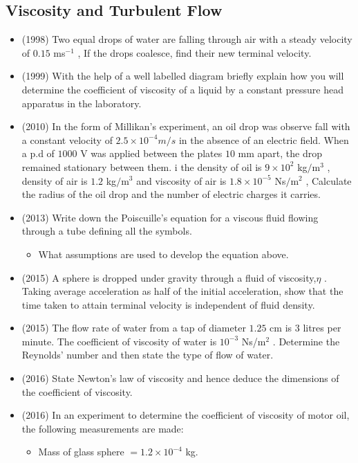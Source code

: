 \documentclass{article}
\begin{document}
\subsection{Viscosity and Turbulent Flow}
\begin{itemize}
\item (1998)  Two equal drops of water are falling through air with a steady velocity of $ 0.15$ ms$ ^{-1}$ , If the drops coalesce, find their new terminal velocity.
\item (1999)  With the help of a well labelled diagram briefly explain how you will determine the coefficient of viscosity of a liquid by a constant pressure head apparatus in the laboratory.
\item (2010)  In the form of Millikan’s experiment, an oil drop was observe fall with a constant velocity of $ 2.5	\times 10^{-4}m/s$ in the absence of an electric field. When a p.d of $ 1000$ V was applied between the plates $ 10$ mm apart, the drop remained stationary between them. i the density of oil is $ 9 \times 10^{2}$ kg$/$m$ ^{3}$ , density of air is $ 1.2$ kg$/$m$ ^{3}$ and viscosity of air is $ 1.8\times 10^{-5}$ Ns$/$m$ ^{2}$ , Calculate the radius of the oil drop and the number of electric charges it carries.
\item (2013)  Write down the Poiscuille’s equation for a viscous fluid flowing through a tube defining all the symbols.\begin{itemize}
\item What assumptions are used to develop the equation above. 
\end{itemize}
\item (2015)  A sphere is dropped under gravity through a fluid of viscosity,$ \eta $ .  Taking average acceleration as half of the initial acceleration, show that the time taken to attain terminal velocity is independent of fluid density.
\item (2015)  The flow rate of water from a tap of diameter $ 1.25$ cm is $ 3$ litres per minute.  The coefficient of viscosity of water is $ 10^{-3}$ Ns/m$ ^{2}$ .  Determine the Reynolds’ number and then state the type of flow of water.
\item (2016)  State Newton’s law of viscosity and hence deduce the dimensions of the coefficient of viscosity.
\item (2016)  In an experiment to determine the coefficient of viscosity of motor oil, the following measurements are made:\begin{itemize}
\item Mass of glass sphere $ =1.2 \times 10^{-4}$ kg.

\end{itemize}
\end{itemize}
\end{document}
